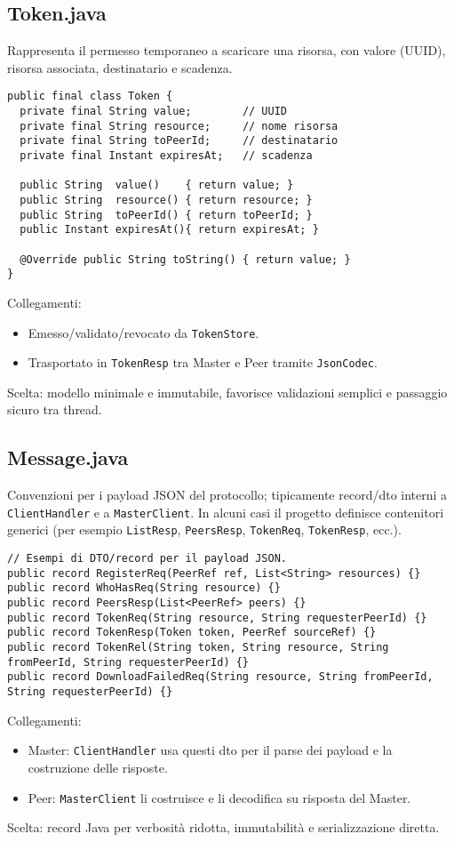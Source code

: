\documentclass[a4paper,12pt]{article}
\begin{document}
\subsection*{Token.java}
Rappresenta il permesso temporaneo a scaricare una risorsa, con valore (UUID), risorsa associata, destinatario e scadenza.
\begin{lstlisting}
public final class Token {
  private final String value;        // UUID
  private final String resource;     // nome risorsa
  private final String toPeerId;     // destinatario
  private final Instant expiresAt;   // scadenza

  public String  value()    { return value; }
  public String  resource() { return resource; }
  public String  toPeerId() { return toPeerId; }
  public Instant expiresAt(){ return expiresAt; }

  @Override public String toString() { return value; }
}
\end{lstlisting}
Collegamenti:
\begin{itemize}[nosep]
  \item Emesso/validato/revocato da \texttt{TokenStore}.
  \item Trasportato in \texttt{TokenResp} tra Master e Peer tramite \texttt{JsonCodec}.
\end{itemize}
Scelta: modello minimale e immutabile, favorisce validazioni semplici e passaggio sicuro tra thread.

\subsection*{Message.java}
Convenzioni per i payload JSON del protocollo; tipicamente record/dto interni a \texttt{ClientHandler} e a \texttt{MasterClient}. In alcuni casi il progetto definisce contenitori generici (per esempio \texttt{ListResp}, \texttt{PeersResp}, \texttt{TokenReq}, \texttt{TokenResp}, ecc.).
\begin{lstlisting}
// Esempi di DTO/record per il payload JSON.
public record RegisterReq(PeerRef ref, List<String> resources) {}
public record WhoHasReq(String resource) {}
public record PeersResp(List<PeerRef> peers) {}
public record TokenReq(String resource, String requesterPeerId) {}
public record TokenResp(Token token, PeerRef sourceRef) {}
public record TokenRel(String token, String resource, String fromPeerId, String requesterPeerId) {}
public record DownloadFailedReq(String resource, String fromPeerId, String requesterPeerId) {}
\end{lstlisting}
Collegamenti:
\begin{itemize}[nosep]
  \item Master: \texttt{ClientHandler} usa questi dto per il parse dei payload e la costruzione delle risposte.
  \item Peer: \texttt{MasterClient} li costruisce e li decodifica su risposta del Master.
\end{itemize}
Scelta: record Java per verbosità ridotta, immutabilità e serializzazione diretta.
\end{document}
